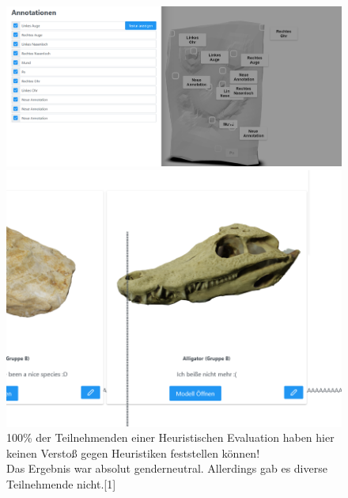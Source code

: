 \documentclass[12pt, aspectratio=169]{beamer}
\begin{document}
\begin{frame}
\begin{figure}
	\begin{minipage}[b]{0.45\linewidth}
		\centering
		\includegraphics[width=\textwidth]{image/Heur2.png}
	\end{minipage}
	\hspace{0.5cm}
	\begin{minipage}[b]{0.45\linewidth}
		\centering
		\includegraphics[width=\textwidth]{image/Heur1.png}
	\end{minipage}
	\caption{100\% der Teilnehmenden einer Heuristischen Evaluation haben hier keinen Verstoß gegen Heuristiken feststellen können!
	\ \\ Das Ergebnis war absolut genderneutral. Allerdings gab es diverse Teilnehmende nicht.\tiny{[1]}}
\end{figure}

\end{frame}
\end{document}
